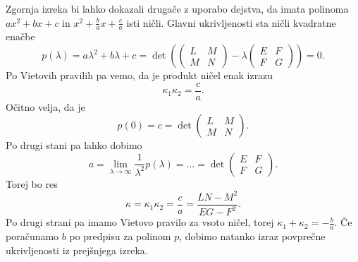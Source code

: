\begin{opomba}
Zgornja izreka bi lahko dokazali drugače z uporabo dejstva, da imata polinoma $a x^2 + b x + c$ in $x^2 + \frac{b}{a} x + \frac{c}{a}$ isti ničli.
Glavni ukrivljenosti sta ničli kvadratne enačbe \begin{equation*}
 p(\lambda) = a \lambda^2 + b \lambda + c =  \det \left( 
   \begin{pmatrix}
 L & M \\
 M & N
 \end{pmatrix}  - \lambda \begin{pmatrix}
E & F \\
F & G
\end{pmatrix} \right) = 0.
\end{equation*}
Po Vietovih pravilih pa vemo, da je produkt ničel enak izrazu \begin{equation*}
\kappa_1 \kappa_2 = \frac{c}{a}.
\end{equation*}  
Očitno velja, da je $$p(0) = c = \det \begin{pmatrix}
L & M \\
M & N
\end{pmatrix}.$$ Po drugi stani pa lahko dobimo \begin{equation*}
a = \lim_{\lambda \to \infty} \frac{1}{\lambda^2} p(\lambda) = \ldots = \det \begin{pmatrix}
E & F \\
F & G
\end{pmatrix}.
\end{equation*}
Torej bo res \begin{equation*}
\kappa = \kappa_1 \kappa_2 = \frac{c}{a} = \frac{LN - M^2}{EG - F^2}.
\end{equation*}
Po drugi strani pa imamo Vietovo pravilo za vsoto ničel, torej $\kappa_1 + \kappa_2 = -\frac{b}{a}$. Če poračunamo
$b$ po predpisu za polinom $p$, dobimo natanko izraz povprečne ukrivljenosti iz prejšnjega izreka. 
\end{opomba}

